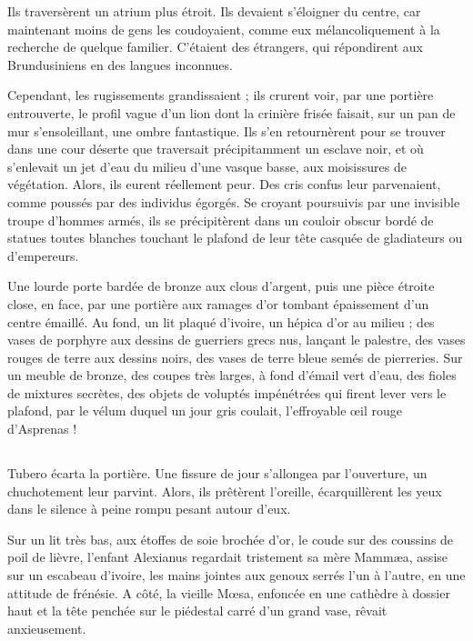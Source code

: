 \documentclass[a4paper, 11pt, oneside, polutonikogreek, french]{article}
\begin{document}
Ils traversèrent un atrium plus étroit. Ils devaient s'éloigner du centre, car maintenant moins de gens les coudoyaient, comme eux mélancoliquement à la recherche de quelque familier. C'étaient des étrangers, qui répondirent aux Brundusiniens en des langues inconnues.

Cependant, les rugissements grandissaient ; ils crurent voir, par une portière entrouverte, le profil vague d'un lion dont la crinière frisée faisait, sur un pan de mur s'ensoleillant, une ombre fantastique. Ils s'en retournèrent pour se trouver dans une cour déserte que traversait précipitamment un esclave noir, et où s'enlevait un jet d'eau du milieu d'une vasque basse, aux moisissures de végétation. Alors, ils eurent réellement peur. Des cris confus leur parvenaient, comme poussés par des individus égorgés. Se croyant poursuivis par une invisible troupe d'hommes armés, ils se précipitèrent dans un couloir obscur bordé de statues toutes blanches touchant le plafond de leur tête casquée de gladiateurs ou d'empereurs.

Une lourde porte bardée de bronze aux clous d'argent, puis une pièce étroite close, en face, par une portière aux ramages d'or tombant épaissement d'un centre émaillé. Au fond, un lit plaqué d'ivoire, un hépica d'or au milieu ; des vases de porphyre aux dessins de guerriers grecs nus, lançant le palestre, des vases rouges de terre aux dessins noirs, des vases de terre bleue semés de pierreries. Sur un meuble de bronze, des coupes très larges, à fond d'émail vert d'eau, des fioles de mixtures secrètes, des objets de voluptés impénétrées qui firent lever vers le plafond, par le vélum duquel un jour gris coulait, l'effroyable œil rouge d'Asprenas !
\clearpage
\subsection{}
\paragraph{}
Tubero écarta la portière. Une fissure de jour s'allongea par l'ouverture, un chuchotement leur parvint. Alors, ils prêtèrent l'oreille, écarquillèrent les yeux dans le silence à peine rompu pesant autour d'eux.

Sur un lit très bas, aux étoffes de soie brochée d'or, le coude sur des coussins de poil de lièvre, l'enfant Alexianus regardait tristement sa mère Mammæa, assise sur un escabeau d'ivoire, les mains jointes aux genoux serrés l'un à l'autre, en une attitude de frénésie. A côté, la vieille Mœsa, enfoncée en une cathèdre à dossier haut et la tête penchée sur le piédestal carré d'un grand vase, rêvait anxieusement.
\end{document}
